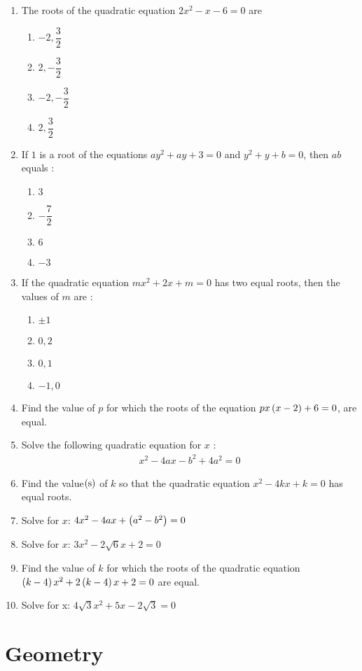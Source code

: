 \begin{enumerate}
\item The roots of the quadratic equation  $2x^2 - x - 6 = 0$ are 
\begin{enumerate}
\item $-2,\dfrac{3}{2}$ 
\item $2,-\dfrac{3}{2}$ 
\item $-2,-\dfrac{3}{2}$ 
\item $2,\dfrac{3}{2}$ 
\end{enumerate}
\item If $1$ is a root of the equations $ay^2 + ay + 3 = 0$ and $y^2 + y + b = 0$, then $ab$ equals : 
\begin{enumerate}
\item $3$ 
\item $-\dfrac{7}{2}$ 
\item $6$ 
\item $-3$ 
\end{enumerate}
\item If the quadratic equation $mx^2 + 2x + m = 0$ has two equal roots, then the values of $m$ are : 
\begin{enumerate}
\item $\pm 1$ 
\item $0,2$ 
\item $0,1$ 
\item $-1,0$ 
\end{enumerate}
\item Find the value of $p$ for which the roots of the equation $px\left(x-2\right) + 6 = 0$, are equal. 
\item Solve the following quadratic equation for $x$ : 
\begin{align}
x^2 - 4 a x - b^2 + 4a^2 = 0 
\end{align}
\item Find the value$\left(\text{s}\right)$ of $k$ so that the quadratic equation $x^2 - 4kx + k = 0$ has equal roots. 
\item Solve for $x$: $4x^2 - 4ax + \left(a^2 - b^2\right) = 0$ 
\item Solve for $x$: $3x^2 - 2\sqrt 6 x + 2 = 0$ 

\item Find the value of $k$ for which the roots of the quadratic equation $\left(k - 4\right) x^2 + 2\left(k-4\right) x + 2 =0$ are equal. 
\item Solve for x: 
$4\sqrt 3 x^2 + 5x - 2\sqrt 3 = 0$ 
\end{enumerate}
\section{Geometry}
